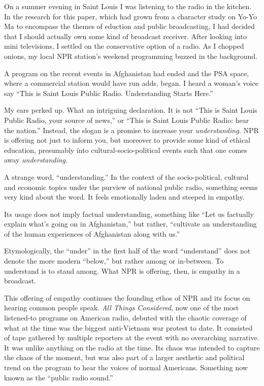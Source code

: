 \documentclass[12pt,letterpaper]{article}
\begin{document}
	\noindent
	On a summer evening in Saint Louis I was listening to the radio in
	the kitchen. In the research for this paper, which had grown from a 
	character
	study on Yo-Yo Ma to encompass the themes of eduction and public 
	broadcasting,
	I had decided that I should actually own some kind of broadcast 
	receiver. 
	After looking into mini televisions, I settled on the conservative 
	option
	of a radio. As I chopped onions, my local NPR station's weekend 
	programming
	buzzed in the background.
	
	A program on the recent events in Afghanistan had ended and the PSA 
	space, where a commercial station
	would have run adds, began. I heard a woman's voice say ``This is Saint
	Louis Public Radio. Understanding Starts Here.'' 

	My ears perked up. What an intriguing declaration. It is not ``This is 
	Saint Louis Public Radio, your source of news,'' or ``This is Saint 
	Louis Public Radio: hear the nation.'' Instead, the 
	slogan is a 
	promise to increase your \textit{understanding. }NPR is offering not
	just to 
	inform you, but moreover to provide some kind of ethical education,
	presumably into cultural-socio-political events such that one comes away
	\textit{understanding.}

	A strange word, ``understanding.'' In the context of the 
	socio-political,
	cultural and economic topics under the purview of national public 
	radio, something seems very kind about the word. It feels emotionally
	laden and steeped in empathy. 

	Its usage does not imply factual understanding, something like ``Let
	us factually explain what's going on in Afghanistan,'' but rather, 
	``cultivate an understanding of the human experiences of Afghanistan 
	along with us.'' 


	Etymologically, the ``under'' in the first half of the word 
	``understand'' does not denote the more modern ``below,'' but rather 
	among or in-between. \autocite{Ety} To understand is to stand among. 
	What NPR is offering, then, is empathy in a broadcast. 


	This offering of empathy continues the founding ethos of NPR 
	and its focus on hearing common people speak. 
	\textit{All Things Considered}, now one of the most listened-to programs
	on American radio, debuted with the chaotic coverage of
	what at the time was the biggest anti-Vietnam war protest to date. It
	consisted of tape gathered by multiple reporters at the event with no 
	overarching narrative. It was unlike anything on the radio at the time.
	Its chaos was intended to capture the chaos of the moment, but was also
	part of a larger aesthetic and political trend on the program to hear 
	the voices of normal Americans. Something now known as the 
	``public radio sound.'' 
\end{document}
